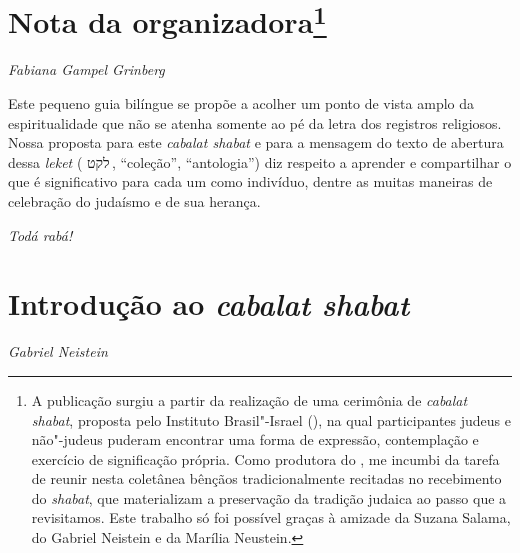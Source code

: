 

\chapter*{Nota da organizadora\footnote{ 
	A publicação surgiu a partir da realização de uma cerimônia de 
	\emph{cabalat shabat}, proposta pelo Instituto Brasil"-Israel (), na qual participantes judeus e não"-judeus puderam encontrar uma forma de expressão, contemplação e exercício de significação própria. Como produtora do , me incumbi da tarefa de reunir nesta coletânea bênçãos tradicionalmente recitadas no recebimento do \emph{shabat}, que materializam a preservação da tradição judaica ao passo que a revisitamos.
	Este trabalho só foi possível graças à amizade da Suzana Salama, do Gabriel Neistein e da Marília Neustein.} }


\begin{flushright}
\emph{Fabiana Gampel Grinberg}
\end{flushright}


Este pequeno guia bilíngue
 se propõe a acolher um ponto de vista amplo da espiritualidade que não se atenha somente ao pé da letra dos registros religiosos. Nossa proposta para este \emph{cabalat shabat} e  para a mensagem do texto de abertura dessa \emph{leket} ( {לקט}\,, ``coleção'', ``antologia'') diz respeito a aprender e compartilhar o que é significativo para cada um como indivíduo, dentre as muitas maneiras de celebração do judaísmo e de sua herança.%

\medskip
\emph{Todá rabá!}


\chapter*{Introdução ao \emph{cabalat shabat}}


\begin{flushright}
\emph{Gabriel Neistein}
\end{flushright}



